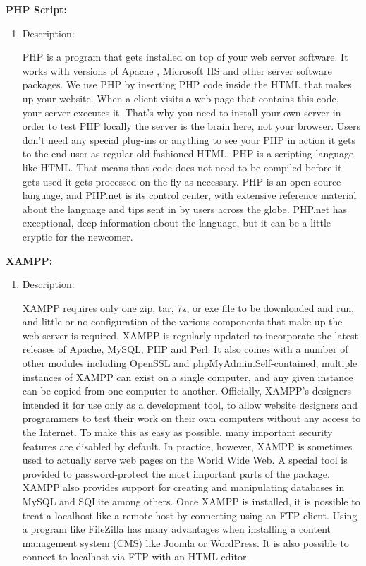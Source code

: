 {\bfseries PHP Script:}
\begin{enumerate}
\item Description:

PHP is a program that gets installed on top of your web server software. It works with versions of Apache , Microsoft IIS and other server software packages. We use PHP by inserting PHP code inside the HTML that makes up your website. When a client  visits a web page that contains this code, your server executes it. That’s why you need to install your own server in order to test PHP locally the server is the brain here, not your browser. Users don’t need any special plug-ins or anything to see your PHP in action it gets to the end user as regular old-fashioned HTML. PHP is a scripting language, like HTML. That means that code does not need to be compiled before it gets used it gets processed on the fly as necessary. 
 PHP is an open-source language, and PHP.net is its control center, with extensive reference material about the language and tips sent in by users across the globe. PHP.net has exceptional, deep information about the language, but it can be a little cryptic for the newcomer.  


\end{enumerate}

{\bfseries XAMPP:}
\begin{enumerate}
\item Description:

XAMPP requires only one zip, tar, 7z, or exe file to be downloaded and run, and little or no configuration of the various components that make up the web server is required. XAMPP is regularly updated to incorporate the latest releases of Apache, MySQL, PHP and Perl. It also comes with a number of other modules including OpenSSL and phpMyAdmin.Self-contained, multiple instances of XAMPP can exist on a single computer, and any given instance can be copied from one computer to another.
Officially, XAMPP's designers intended it for use only as a development tool, to allow website designers and programmers to test their work on their own computers without any access to the Internet. To make this as easy as possible, many important security features are disabled by default. In practice, however, XAMPP is sometimes used to actually serve web pages on the World Wide Web. A special tool is provided to password-protect the most important parts of the package. XAMPP also provides support for creating and manipulating databases in MySQL and SQLite among others.
Once XAMPP is installed, it is possible to treat a localhost like a remote host by connecting using an FTP client. Using a program like FileZilla has many advantages when installing a content management system (CMS) like Joomla or WordPress. It is also possible to connect to localhost via FTP with an HTML editor.
  
\end{enumerate}


 